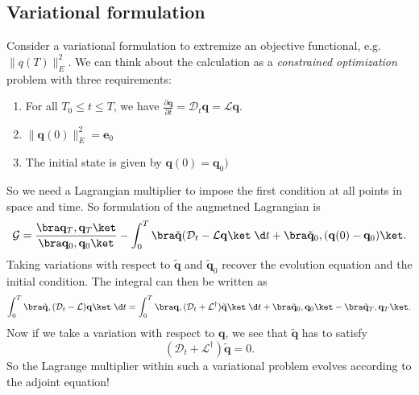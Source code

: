 \documentclass[a4paper]{article}
\begin{document}
\subsection{Variational formulation}
Consider a variational formulation to extremize an objective functional, e.g.\ $\|q(T)\|_E^2$. We can think about the calculation as a \emph{constrained optimization} problem with three requirements:
\begin{enumerate}
  \item For all $T_0 \leq t \leq T$, we have $\frac{\partial \mathbf{q}}{\partial t} = \mathcal{D}_t \mathbf{q} = \mathcal{L} \mathbf{q}$.
  \item $\|\mathbf{q}(0)\|_E^2 = \mathbf{e}_0$
  \item The initial state is given by $\mathbf{q}(0) = \mathbf{q}_0)$
\end{enumerate}
So we need a Lagrangian multiplier to impose the first condition at all points in space and time. So formulation of the augmetned Lagrangian is
\[
  \mathcal{G} = \frac{\bra \mathbf{q}_T, \mathbf{q}_T\ket}{\bra \mathbf{q}_0, \mathbf{q}_0\ket} - \int_0^T \bra \tilde{\mathbf{q}} (\mathcal{D}_t - \mathcal{L} \mathbf{q}\ket \;\d t + \bra \tilde{\mathbf{q}}_0, (\mathbf{q}(0) - \mathbf{q}_0)\ket.
\]
Taking variations with respect to $\tilde{\mathbf{q}}$ and $\tilde{\mathbf{q}}_0$ recover the evolution equation and the initial condition. The integral can then be written as
\[
  \int_0^T \bra \tilde{\mathbf{q}}, (\mathcal{D}_t - \mathcal{L})\mathbf{q}\ket \;\d t = \int_0^T \bra \mathbf{q}, (\mathcal{D}_t + \mathcal{L}^\dagger) \tilde{\mathbf{q}}\ket \;\d t + \bra \tilde{\mathbf{q}}_0, \mathbf{q}_0\ket - \bra \tilde{\mathbf{q}}_T, \mathbf{q}_T\ket.
\]
Now if we take a variation with respect to $\mathbf{q}$, we see that $\tilde{\mathbf{q}}$ has to satisfy
\[
  (\mathcal{D}_t + \mathcal{L}^\dagger) \tilde{\mathbf{q}} = 0.
\]
So the Lagrange multiplier within such a variational problem evolves according to the adjoint equation!
\end{document}
